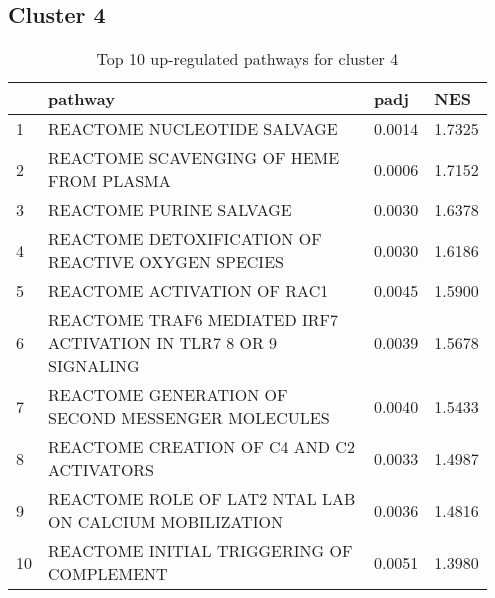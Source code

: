 \documentclass{article}
\begin{document}
\subsection{Cluster 4 }
\begin{table}[H]
\centering
\begin{tabular}{p{0.05\linewidth}p{0.7\linewidth}p{0.1\linewidth}p{0.1\linewidth}}
  \hline
 & pathway & padj & NES \\ 
  \hline
1 & REACTOME NUCLEOTIDE SALVAGE & 0.0014 & 1.7325 \\ 
  2 & REACTOME SCAVENGING OF HEME FROM PLASMA & 0.0006 & 1.7152 \\ 
  3 & REACTOME PURINE SALVAGE & 0.0030 & 1.6378 \\ 
  4 & REACTOME DETOXIFICATION OF REACTIVE OXYGEN SPECIES & 0.0030 & 1.6186 \\ 
  5 & REACTOME ACTIVATION OF RAC1 & 0.0045 & 1.5900 \\ 
  6 & REACTOME TRAF6 MEDIATED IRF7 ACTIVATION IN TLR7 8 OR 9 SIGNALING & 0.0039 & 1.5678 \\ 
  7 & REACTOME GENERATION OF SECOND MESSENGER MOLECULES & 0.0040 & 1.5433 \\ 
  8 & REACTOME CREATION OF C4 AND C2 ACTIVATORS & 0.0033 & 1.4987 \\ 
  9 & REACTOME ROLE OF LAT2 NTAL LAB ON CALCIUM MOBILIZATION & 0.0036 & 1.4816 \\ 
  10 & REACTOME INITIAL TRIGGERING OF COMPLEMENT & 0.0051 & 1.3980 \\ 
   \hline
\end{tabular}
\caption{Top 10 up-regulated pathways for cluster 4} 
\label{tab:q3_2_4}
\end{table}
\end{document}
